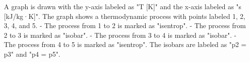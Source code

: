 A graph is drawn with the y-axis labeled as "T [K]" and the x-axis labeled as "s [kJ/kg·K]". The graph shows a thermodynamic process with points labeled 1, 2, 3, 4, and 5.  
- The process from 1 to 2 is marked as "isentrop".  
- The process from 2 to 3 is marked as "isobar".  
- The process from 3 to 4 is marked as "isobar".  
- The process from 4 to 5 is marked as "isentrop".  
The isobars are labeled as "p2 = p3" and "p4 = p5".